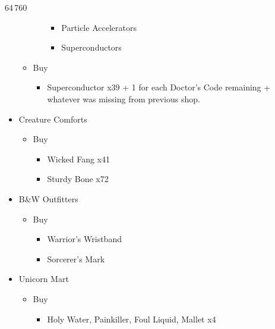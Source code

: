 \begin{multicols}{2}
\begin{shop}{64\,760}
\begin{itemize}
\begin{itemize}
\begin{itemize}
\begin{itemize}
                \item Particle Accelerators
                \item Superconductors
            \end{itemize}
        \end{itemize}
        \item Buy
        \begin{itemize}
            \item Superconductor x39 + 1 for each Doctor's Code remaining + whatever was missing from previous shop.
        \end{itemize}
    \end{itemize}
    \item Creature Comforts
    \begin{itemize}
        \item Buy
        \begin{itemize}
            \item Wicked Fang x41
            \item Sturdy Bone x72
        \end{itemize}
    \end{itemize}
    \item B\&W Outfitters
    \begin{itemize}
        \item Buy
        \begin{itemize}
            \item Warrior's Wristband
            \item Sorcerer's Mark
        \end{itemize}
    \end{itemize}
    \item Unicorn Mart
    \begin{itemize}
        \item Buy
        \begin{itemize}
            \item Holy Water, Painkiller, Foul Liquid, Mallet x4
        \end{itemize}
    \end{itemize}
\end{itemize}
\end{shop}


\end{multicols}
